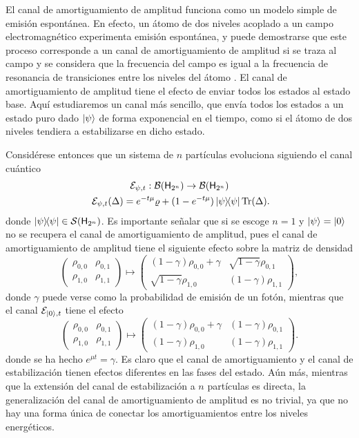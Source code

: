 El canal de amortiguamiento de amplitud funciona como un modelo simple de emisión espontánea. En efecto, un átomo de dos niveles acoplado a un campo electromagnético experimenta emisión espontánea, y puede demostrarse que este proceso corresponde a un canal de amortiguamiento de amplitud si se traza al campo y se considera que la frecuencia del campo es igual a la frecuencia de resonancia de transiciones entre los niveles del átomo \cite{Fox}. El canal de amortiguamiento de amplitud tiene el efecto de enviar todos los estados al estado base. Aquí estudiaremos un canal más sencillo, que envía todos los estados a un estado puro dado $\ket{\psi}$ de forma exponencial en el tiempo, como si el átomo de dos niveles tendiera a estabilizarse en dicho estado.

Considérese entonces que un sistema de $n$ partículas evoluciona siguiendo el canal cuántico
\begin{gather}
    \mcE_{\psi,t}:\mcB(\hilbert_{2^{n}}) \rightarrow \mcB(\hilbert_{2^{n}})\nonumber\\
    \mcE_{\psi,t}(\Delta)=e^{-t\mu}\varrho+(1-e^{-t \mu})\dyad{\psi}\Tr(\Delta)\rlap{.}\nonumber
\end{gather}
donde $\dyad{\psi}\in \densityspace{2^{n}}$. Es importante señalar que si se escoge $n=1$ y $\ket{\psi}=\ket{0}$ no se recupera el canal de amortiguamiento de amplitud, pues el canal de amortiguamiento de amplitud tiene el siguiente efecto sobre la matriz de densidad
\begin{equation}
    \begin{pmatrix}
        \rho_{0,0} & \rho_{0,1} \\
        \rho_{1,0} & \rho_{1,1}
    \end{pmatrix}\mapsto\begin{pmatrix}
        (1-\gamma)\rho_{0,0}+\gamma & \sqrt{1-\gamma}\rho_{0,1} \\
        \sqrt{1-\gamma}\rho_{1,0} & (1-\gamma)\rho_{1,1}
    \end{pmatrix},\nonumber
\end{equation}
donde $\gamma$ puede verse como la probabilidad de emisión de un fotón, mientras que el canal $\mathcal{E}_{\ket{0},t}$ tiene el efecto
\begin{equation}
    \begin{pmatrix}
        \rho_{0,0} & \rho_{0,1} \\
        \rho_{1,0} & \rho_{1,1}
    \end{pmatrix}\mapsto\begin{pmatrix}
        (1-\gamma)\rho_{0,0}+\gamma & (1-\gamma)\rho_{0,1} \\
        (1-\gamma)\rho_{1,0} & (1-\gamma)\rho_{1,1}
    \end{pmatrix}.\nonumber
\end{equation}
donde se ha hecho $e^{\mu t}=\gamma$. Es claro que el canal de amortiguamiento y el canal de estabilización tienen efectos diferentes en las fases del estado. Aún más, mientras que la extensión del canal de estabilización a $n$ partículas es directa, la generalización del canal de amortiguamiento de amplitud es no trivial, ya que no hay una forma única de conectar los amortiguamientos entre los niveles energéticos.

